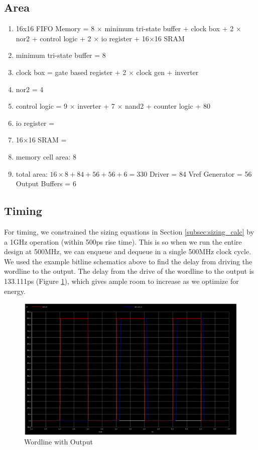 \documentclass[a4paper]{article}
\begin{document}
\subsection{Area}
\begin{enumerate}
\item 16x16 FIFO Memory = 8 $\times$ minimum tri-state buffer + clock box + 2 $\times$ nor2 + control logic + 2 $\times$ io register + 16$\times$16 SRAM
\item minimum tri-state buffer = 8
\item clock box = gate based register + 2 $\times$ clock gen + inverter
\item nor2 = 4
\item control logic = 9 $\times$ inverter + 7 $\times$ nand2 + counter logic + 80
\item io register = 
\item 16$\times$16 SRAM = 


\item memory cell area: 8
\item total area: $16 \times 8 + 84 + 56 + 56 + 6 = 330$
\subitem Driver = 84
\subitem Vref Generator = 56
\subitem Output Buffers = 6
\end{enumerate}

\subsection{Timing}
For timing, we constrained the sizing equations in Section \ref{subsec:sizing_calc} by a 1GHz operation (within 500ps rise time). This is so when we run the entire design at 500MHz, we can enqueue and dequeue in a single 500MHz clock cycle. We used the example bitline schematics above to find the delay from driving the wordline to the output. The delay from the drive of the wordline to the output is 133.111ps (Figure \ref{fig:ioTiming}), which gives ample room to increase as we optimize for energy.

\begin{figure}[H]
	\centering
	\includegraphics[scale=0.2]{exampleBitlineIOTiming}
	\caption{Wordline with Output}
	\label{fig:ioTiming}
\end{figure}
\end{document}
